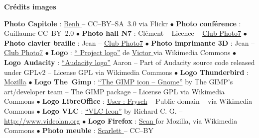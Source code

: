 
\vfill
\begin{center}
\textcolor{Cdl}{\textbf{Crédits images}} \par
{\tiny
 \textbf{Photo Capitole} : \href{https://www.flickr.com/photos/blieusong/6986608500/in/set-72157629942158013}{Benh } -- CC--BY--SA~3.0 via Flickr  \textcolor{Cdl}{$\bullet$}
 \textbf{Photo conférence } : Guillaume  CC--BY~2.0 \textcolor{Cdl}{$\bullet$}
 \textbf{Photo hall N7} : Clément  -- Licence  -- \href{http://www.bde.enseeiht.fr/clubs/photo/}{Club Photo7} \textcolor{Cdl}{$\bullet$}
 \textbf{Photo clavier braille} : Jean  -- \href{http://www.bde.enseeiht.fr/clubs/photo/}{Club Photo7} \textcolor{Cdl}{$\bullet$}
 \textbf{Photo imprimante 3D} : Jean  -- \href{http://www.bde.enseeiht.fr/clubs/photo/}{Club Photo7} \textcolor{Cdl}{$\bullet$}
 \textbf{Logo } : \href{https://commons.wikimedia.org/wiki/File\%3AOfficial_gnu.svg}{“ Project logo”} de \href{mailto:vcopovi@wanadoo.fr}{Victor } via Wikimedia Commons \textcolor{Cdl}{$\bullet$}
 \textbf{Logo Audacity} : \href{https://commons.wikimedia.org/wiki/File:Audacity_Logo.svg#/media/File:Audacity_Logo.svg}{“Audacity logo”} Aaron  -- Part of Audacity source code released under GPLv2 -- License GPL via Wikimedia Commons \textcolor{Cdl}{$\bullet$}
 \textbf{Logo Thunderbird} : \href{}{Mozilla} \textcolor{Cdl}{$\bullet$}
 \textbf{Logo The~Gimp} : \href{https://commons.wikimedia.org/wiki/File:The_GIMP_icon_-_gnome.svg#/media/File:The_GIMP_icon_-_gnome.svg}{“The GIMP icon -- Gnome”} by The GIMP’s art/developer team -- The GIMP package -- License GPL via Wikimedia Commons \textcolor{Cdl}{$\bullet$}
 \textbf{Logo LibreOffice} : \href{https://commons.wikimedia.org/wiki/File\%3ALogo-libreoffice.svg}{User : Frysch} -- Public domain -- via Wikimedia Commons \textcolor{Cdl}{$\bullet$}
 \textbf{Logo VLC} : \href{https://commons.wikimedia.org/wiki/File:VLC_Icon.svg#/media/File:VLC_Icon.svg}{“VLC Icon”} by Richard C. G.  -- \url{http://www.videolan.org} \textcolor{Cdl}{$\bullet$}
 \textbf{Logo Firefox} : \href{https://commons.wikimedia.org/wiki/File\%3AMozilla_Firefox_logo_2013.svg}{Sean } for Mozilla, via Wikimedia Commons \textcolor{Cdl}{$\bullet$}
 \textbf{Photo meuble} : \href{https://www.opendesk.cc/fin/fin-lockers}{Scarlett } -- CC--BY

}
\end{center}
